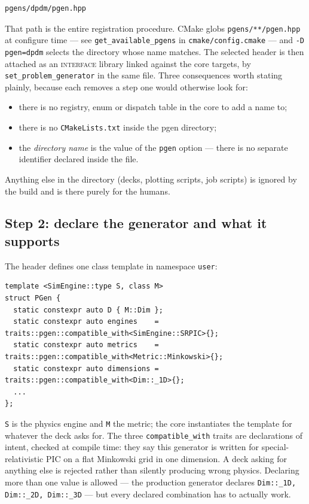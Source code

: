 \documentclass[11pt,a4paper]{article}
\newcommand{\code}[1]{\texttt{\small #1}}
\begin{document}
\begin{lstlisting}
pgens/dpdm/pgen.hpp
\end{lstlisting}

That path is the entire registration procedure. CMake globs
\code{pgens/**/pgen.hpp} at configure time --- see \code{get\_available\_pgens}
in \code{cmake/config.cmake} --- and \code{-D pgen=dpdm} selects the directory whose
name matches. The selected header is then attached as an \textsc{interface} library
linked against the core targets, by \code{set\_problem\_generator} in the same
file. Three consequences worth stating plainly, because each removes a step one
would otherwise look for:

\begin{itemize}[nosep]
  \item there is no registry, enum or dispatch table in the core to add a name to;
  \item there is no \code{CMakeLists.txt} inside the pgen directory;
  \item the \emph{directory name} is the value of the \code{pgen} option --- there is
        no separate identifier declared inside the file.
\end{itemize}

Anything else in the directory (decks, plotting scripts, job scripts) is ignored by
the build and is there purely for the humans.

\subsection{Step 2: declare the generator and what it supports}

The header defines one class template in namespace \code{user}:

\begin{lstlisting}
template <SimEngine::type S, class M>
struct PGen {
  static constexpr auto D { M::Dim };
  static constexpr auto engines    = traits::pgen::compatible_with<SimEngine::SRPIC>{};
  static constexpr auto metrics    = traits::pgen::compatible_with<Metric::Minkowski>{};
  static constexpr auto dimensions = traits::pgen::compatible_with<Dim::_1D>{};
  ...
};
\end{lstlisting}

\code{S} is the physics engine and \code{M} the metric; the core instantiates the
template for whatever the deck asks for. The three \code{compatible\_with} traits are
declarations of intent, checked at compile time: they say this generator is written
for special-relativistic PIC on a flat Minkowski grid in one dimension. A deck asking
for anything else is rejected rather than silently producing wrong physics. Declaring
more than one value is allowed --- the production generator declares
\code{Dim::\_1D, Dim::\_2D, Dim::\_3D} --- but every declared combination has to
actually work.
\end{document}
